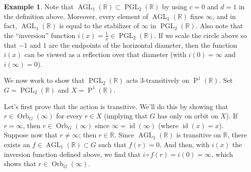 \documentclass[11pt]{amsart}
\theoremstyle{plain}
\theoremstyle{definition}
\newtheorem{example}{Example}
\theoremstyle{remark}
\DeclareMathOperator{\AGL}{AGL}
\DeclareMathOperator{\PGL}{PGL}
\DeclareMathOperator{\Proj}{P}
\DeclareMathOperator{\id}{id}
\DeclareMathOperator{\Orb}{Orb}
\begin{document}
\begin{example}
Note that $\AGL_1(\mathbb{R}) \subset \PGL_2(\mathbb{R})$ by using $c=0$ and $d = 1$ in the definition above. Moreover, every element of $\AGL_1(\mathbb{R})$ fixes $\infty$, and in fact, $\AGL_1(\mathbb{R})$ is equal to the stabilizer of $\infty$ in $\PGL_2(\mathbb{R})$. Also note that the ``inversion'' function $i(x) = \frac{1}{x} \in \PGL_2(\mathbb{R})$. If we scale the circle above so that $-1$ and $1$ are the endpoints of the horizontal diameter, then the function $i(x)$ can be viewed as a reflection over that diameter (with $i(0) = \infty$ and $i(\infty) = 0$). 

\begin{center}
\end{center}

We now work to show that $\PGL_2(\mathbb{R})$ acts $3$-transitively on $\Proj^1(\mathbb{R})$. Set $G = \PGL_2(\mathbb{R})$ and $X = \Proj^1(\mathbb{R})$. 

Let's first prove that the action is transitive.  We'll do this by showing that $r\in \Orb_G(\infty)$ for every $r\in X$ (implying that $G$ has only on orbit on $X$). If $r=\infty$, then $r\in \Orb_G(\infty)$ since $\infty = \id(\infty)$ (where $\id(x) = x$). Suppose now that $r\neq\infty$; then $r\in \mathbb{R}$. Since $\AGL_1(\mathbb{R})$ is transitive on $\mathbb{R}$, there exists an $f\in \AGL_1(\mathbb{R}) \subset G$ such that $f(r) = 0$. And then, with $i(x)$ the inversion function defined above, we find that $i\circ f(r) = i(0) = \infty$, which shows that $r\in \Orb_G(\infty)$.


\end{example}
\end{document}

